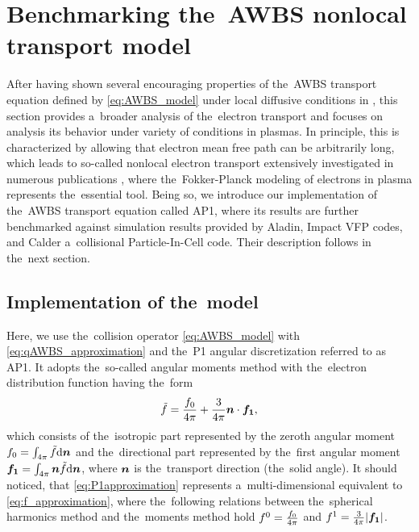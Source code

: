 \section{Benchmarking the~AWBS nonlocal transport model}
\label{sec:BenchmarkingAWBS}
After having shown several encouraging properties of the~AWBS transport 
equation defined by \eqref{eq:AWBS_model} under local diffusive conditions
in , this section provides a~broader analysis
of the~electron transport and focuses on analysis its behavior under variety of
conditions in plasmas. In principle, this is characterized by allowing that
electron mean free path can be arbitrarily long, which leads to so-called 
nonlocal electron transport extensively investigated in numerous publications 
\cite{Malone_1975_15, Colombant_PoP2005, Bell_1981_83, LMV_1983_7, Brantov_Nonlocal_electron_transport_1998, schurtz2000, Sorbo_2015}, where the~Fokker-Planck
modeling of electrons in plasma represents the~essential tool. Being so, 
we introduce our implementation of the~AWBS transport equation called AP1,
where its results are further benchmarked against simulation results
provided by Aladin, Impact VFP codes, and Calder a~collisional Particle-In-Cell
code. Their description follows in the~next section.

\subsection{Implementation of the~model}
\label{sec:C7code}

Here, we use the~collision operator \eqref{eq:AWBS_model} with 
\eqref{eq:qAWBS_approximation} and the~P1 angular discretization 
referred to as AP1. It adopts the~so-called angular 
moments method with the~electron distribution function having the~form
\begin{equation}
  \tilde{f} = \frac{f_0}{4\pi} + \frac{3}{4\pi}\boldsymbol{n}\cdot\boldsymbol{f_1} , 
  \label{eq:P1approximation}
\end{equation}
which consists of the~isotropic part represented by the zeroth angular moment 
$f_0 = \int_{4\pi} \tilde{f} \text{d}\boldsymbol{n}$ 
and the~directional part represented by the~first angular moment 
$\boldsymbol{f_1} = \int_{4\pi} \boldsymbol{n}
\tilde{f} \text{d}\boldsymbol{n}$, where $\boldsymbol{n}$ is the~transport direction (the~solid angle).
It should noticed, that \eqref{eq:P1approximation} represents 
a~multi-dimensional equivalent to \eqref{eq:f_approximation}, where 
the~following relations between the~spherical harmonics method
and the~moments method hold $f^0 = \frac{f_0}{4\pi}$ and 
$f^1 = \frac{3}{4\pi}|\boldsymbol{f_1}|$.

